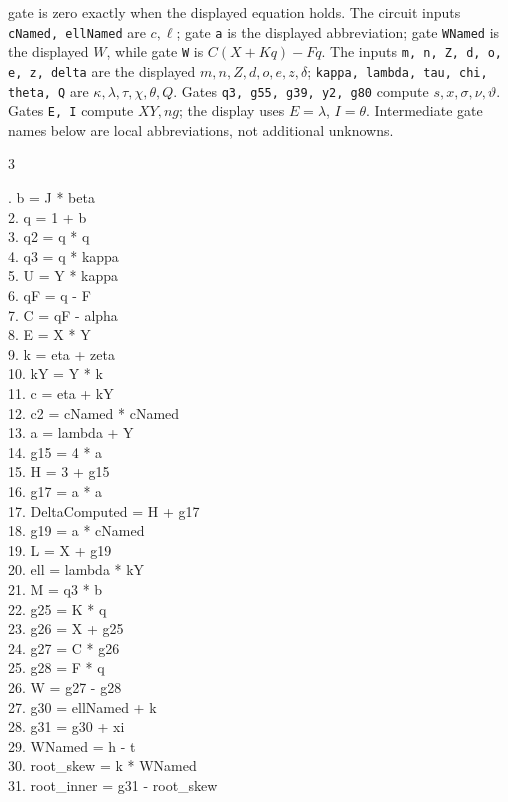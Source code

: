 \documentclass[10pt]{article}
\begin{document}
gate is zero exactly when the displayed equation holds. The circuit inputs
\texttt{cNamed, ellNamed} are $c,\ell$; gate \texttt{a} is the displayed abbreviation; gate \texttt{WNamed} is the
displayed $W$, while gate \texttt{W} is $C(X+Kq)-Fq$. The inputs
\texttt{m, n, Z, d, o, e, z, delta} are the displayed
$m,n,Z,d,o,e,z,\delta$; \texttt{kappa, lambda, tau, chi, theta, Q}
are $\kappa,\lambda,\tau,\chi,\theta,Q$. Gates \texttt{q3, g55, g39, y2, g80} compute $s,x,\sigma,\nu,\vartheta$. Gates \texttt{E, I} compute
$XY,ng$; the display uses $E=\lambda$, $I=\theta$. Intermediate gate
names below are local abbreviations, not additional unknowns.
\begin{multicols}{3}
\raggedright\ttfamily\fontsize{7.2}{8.4}. b = J * beta\\
2. q = 1 + b\\
3. q2 = q * q\\
4. q3 = q * kappa\\
5. U = Y * kappa\\
6. qF = q - F\\
7. C = qF - alpha\\
8. E = X * Y\\
9. k = eta + zeta\\
10. kY = Y * k\\
11. c = eta + kY\\
12. c2 = cNamed * cNamed\\
13. a = lambda + Y\\
14. g15 = 4 * a\\
15. H = 3 + g15\\
16. g17 = a * a\\
17. DeltaComputed = H + g17\\
18. g19 = a * cNamed\\
19. L = X + g19\\
20. ell = lambda * kY\\
21. M = q3 * b\\
22. g25 = K * q\\
23. g26 = X + g25\\
24. g27 = C * g26\\
25. g28 = F * q\\
26. W = g27 - g28\\
27. g30 = ellNamed + k\\
28. g31 = g30 + xi\\
29. WNamed = h - t\\
30. root\_skew = k * WNamed\\
31. root\_inner = g31 - root\_skew\\

\end{multicols}
\end{document}
